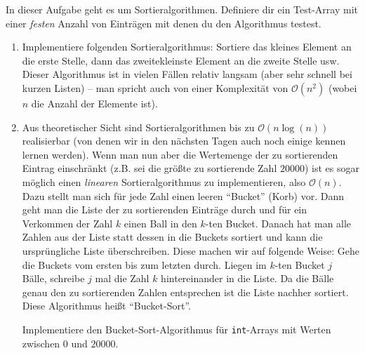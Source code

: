 \documentclass{uebungszettel}
\begin{document}
\begin{aufg} In dieser Aufgabe geht es um Sortieralgorithmen. Definiere dir ein Test-Array mit einer \emph{festen} 
Anzahl von Einträgen mit denen du den Algorithmus testest.
\begin{enumerate} 
\item Implementiere folgenden Sortieralgorithmus: Sortiere das kleines Element an die erste Stelle, dann das 
zweitekleinste Element an die zweite Stelle usw. Dieser Algorithmus ist in vielen Fällen relativ langsam (aber sehr 
schnell bei kurzen Listen) -- man spricht auch von einer Komplexität von $\mathcal O(n^2)$ (wobei $n$ die Anzahl der 
Elemente ist). 
\item Aus theoretischer Sicht sind Sortieralgorithmen bis zu $\mathcal O(n \log(n))$ realisierbar (von denen wir in den 
nächsten Tagen auch noch einige kennen lernen werden). Wenn man nun aber die Wertemenge der zu sortierenden Eintrag 
einschränkt (z.B. sei die größte zu sortierende Zahl $20000$) ist es sogar möglich einen \emph{linearen} 
Sortieralgorithmus zu implementieren, also $\mathcal O(n)$. Dazu stellt man sich für jede Zahl einen leeren ``Bucket'' 
(Korb) vor. Dann geht man die Liste der zu sortierenden Einträge durch und für ein Verkommen der Zahl $k$ einen Ball in 
den $k$-ten Bucket. Danach hat man alle Zahlen aus der Liste statt dessen in die Buckets sortiert und kann die 
ursprüngliche Liste überschreiben. Diese machen wir auf folgende Weise: Gehe die Buckets vom ersten bis zum letzten 
durch. Liegen im $k$-ten Bucket $j$ Bälle, schreibe $j$ mal die Zahl $k$ hintereinander in die Liste. Da die Bälle 
genau den zu sortierenden Zahlen entsprechen ist die Liste nachher sortiert. Diese Algorithmus heißt ``Bucket-Sort''. 

Implementiere den Bucket-Sort-Algorithmus für \verb|int|-Arrays mit Werten zwischen $0$ und $20000$.
\end{enumerate}
\end{aufg}
\end{document}
